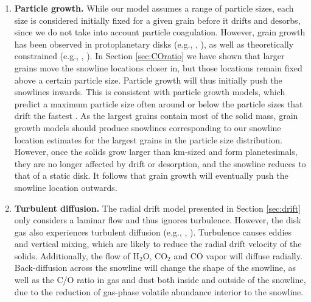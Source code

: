 \documentclass[apj]{emulateapj}
\begin{document}
\begin{enumerate}
\item \textbf{Particle growth.} While our model assumes a range of particle sizes, each size is considered initially fixed for a given grain before it drifts and desorbs, since we do not take into account particle coagulation. However, grain growth has been observed in protoplanetary disks (e.g., \citealt{ricci10}, \citealt{perez12}), as well as theoretically constrained (e.g., \citealt{birnstiel10}, \citealt{birnstiel12}). In Section \ref{sec:COratio} we have shown that larger grains move the snowline locations closer in, but those locations remain fixed above a certain particle size. Particle growth will thus initially push the snowlines inwards. This is consistent with particle growth models, which predict a maximum particle size often around or below the particle sizes that drift the fastest \citep{birnstiel12}. As the largest grains contain most of the solid mass, grain growth models should produce snowlines corresponding to our snowline location estimates for the largest grains in the particle size distribution. However, once the solids grow larger than km-sized and form planetesimals, they are no longer affected by drift or desorption, and the snowline reduces to that of a static disk. It follows that grain growth will eventually push the snowline location outwards.

\item \textbf{Turbulent diffusion.} The radial drift model presented in Section \ref{sec:drift} only considers a laminar flow and thus ignores turbulence. However, the disk gas also experiences turbulent diffusion (e.g., \citealt{birnstiel12}, \citealt{alidib14}). Turbulence causes eddies and vertical mixing, which are likely to reduce the radial drift velocity of the solids. Additionally, the flow of H$_2$O, CO$_2$ and CO vapor will diffuse radially. Back-diffusion across the snowline will change the shape of the snowline, as well as the C/O ratio in gas and dust both inside and outside of the snowline, due to the reduction of gas-phase volatile abundance interior to the snowline. 


\end{enumerate}
\end{document}

